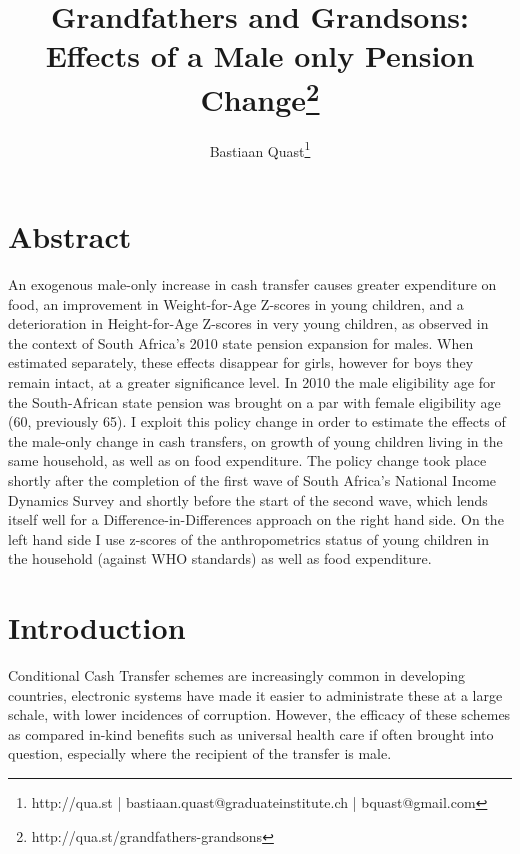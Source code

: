 \documentclass[a4paper,british]{article}\usepackage[]{graphicx}\usepackage[]{color}
\begin{document}
\title{Grandfathers and Grandsons:\\Effects of a Male only Pension Change\thanks{http://qua.st/grandfathers-grandsons}}

\author{Bastiaan Quast\thanks{http://qua.st | bastiaan.quast@graduateinstitute.ch | bquast@gmail.com}}
\maketitle

\section*{Abstract}

An exogenous male-only increase in cash transfer causes greater expenditure
on food, an improvement in Weight-for-Age Z-scores in young children,
and a deterioration in Height-for-Age Z-scores in very young children,
as observed in the context of South Africa's 2010 state pension expansion
for males. When estimated separately, these effects disappear for
girls, however for boys they remain intact, at a greater significance
level. In 2010 the male eligibility age for the South-African state
pension was brought on a par with female eligibility age (60, previously
65). I exploit this policy change in order to estimate the effects
of the male-only change in cash transfers, on growth of young children
living in the same household, as well as on food expenditure. The
policy change took place shortly after the completion of the first
wave of South Africa's National Income Dynamics Survey and shortly
before the start of the second wave, which lends itself well for a
Difference-in-Differences approach on the right hand side. On the
left hand side I use z-scores of the anthropometrics status of young
children in the household (against WHO standards) as well as food
expenditure.




\section{Introduction}

\label{sec:intro} Conditional Cash Transfer schemes are increasingly
common in developing countries, electronic systems have made it easier
to administrate these at a large schale, with lower incidences of
corruption. However, the efficacy of these schemes as compared in-kind
benefits such as universal health care if often brought into question,
especially where the recipient of the transfer is male. 
\end{document}
